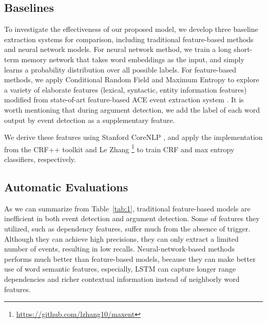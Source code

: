 \documentclass{article}
\begin{document}
\subsection{Baselines}
To investigate the effectiveness of our proposed model, we develop three baseline extraction systems for comparison, including traditional feature-based methods and neural network models. For neural network method, we train a long short-term memory network that takes word embeddings as the input, and simply learns a probability distribution over all possible labels. For feature-based methods, we apply Conditional Random Field \cite{lafferty2001conditional} and Maximum Entropy \cite{berger1996maximum} to explore a variety of elaborate features (lexical, syntactic, entity information features) modified from state-of-art feature-based ACE event extraction system \cite{li2013joint}. It is worth mentioning that during argument detection, we add the label of each word output by event detection as a supplementary feature.

We derive these features using Stanford CoreNLP \cite{manning2014stanford}, and apply the implementation from the CRF++ toolkit \cite{kudo2005crf++} and Le Zhang \footnote{\url{https://github.com/lzhang10/maxent}} to train CRF and max entropy classifiers, respectively.

\subsection{Automatic Evaluations}
As we can summarize from Table~\ref{tab:1}, traditional feature-based models are inefficient in both event detection and argument detection. Some of features they utilized, such as dependency features, suffer much from the absence of trigger. Although they can achieve high precisions, they can only extract a limited number of events, resulting in low recalls. Neural-network-based methods performs much better than feature-based models, because they can make better use of word semantic features, especially, LSTM can capture longer range dependencies and richer contextual information instead of neighborly word features. 
\end{document}
